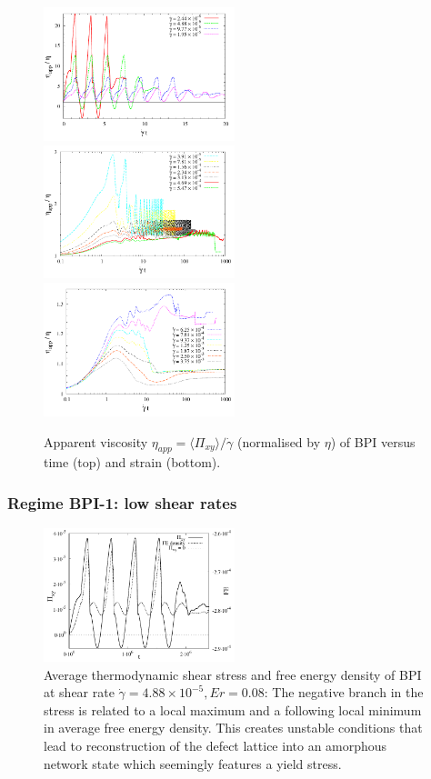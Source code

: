 \documentclass[8.5pt,twoside,twocolumn]{article}
\newcommand{\e}[1]{\times10^{#1}}
\newcommand{\gd}{\dot{\gamma}}
\begin{document}
\begin{figure}[htpb]
\includegraphics[width=0.495\textwidth]{app_visc_strain_bp1_a.pdf}\\
\includegraphics[width=0.495\textwidth]{app_visc_strain_bp1_b.pdf}\\
\includegraphics[width=0.495\textwidth]{app_visc_strain_bp1_c.pdf}
\caption{Apparent viscosity $\eta_{app}=\langle \Pi_{xy}\rangle/\dot{\gamma}$ (normalised by $\eta$) of BPI versus time (top) 
and strain (bottom).}
\label{bp1-appvisc}
\end{figure}


\subsubsection{Regime BPI-1: low shear rates }

\begin{figure}[htpb]
\includegraphics[width=0.495\textwidth]{stress_fe_yield_bp1.pdf}
\caption{Average thermodynamic shear stress and free energy density of BPI at shear rate 
$\gd=4.88\e{-5}, Er=0.08$: The negative branch in the stress is related to a local maximum and a following local 
minimum in average free energy density. This creates unstable conditions that lead 
to reconstruction of the defect lattice into an amorphous network state which 
seemingly features a yield stress.}
\label{bp1-fe-yield}
\end{figure}
\end{document}
